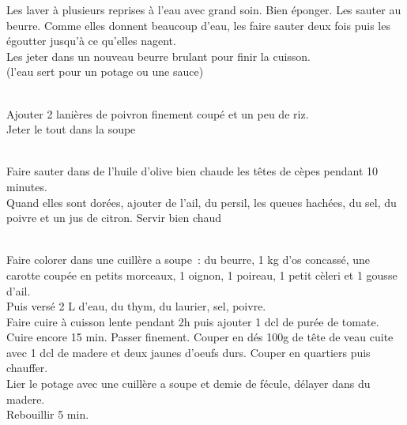 \begin{minipage}[c]{\textwidth}
Les laver à plusieurs reprises à l’eau avec grand soin. Bien éponger. Les sauter au beurre. Comme elles donnent beaucoup d'eau, les faire sauter deux fois puis les égoutter jusqu'à ce qu'elles nagent.\\
Les jeter dans un nouveau beurre brulant pour finir la cuisson.\\
(l'eau sert pour un potage ou une sauce)\\
\\

\end{minipage}

\begin{minipage}[c]{\textwidth}
Ajouter 2 lanières de poivron finement coupé et un peu de riz.\\
Jeter le tout dans la soupe\\
\\

\end{minipage}

\begin{minipage}[c]{\textwidth}
Faire sauter dans de l'huile d'olive bien chaude les têtes de cèpes pendant 10 minutes.\\
Quand elles sont dorées, ajouter de l'ail, du persil, les queues hachées, du sel, du poivre et un jus de citron. Servir bien chaud\\
\\

\end{minipage}

\begin{minipage}[c]{\textwidth}
Faire colorer dans une cuillère a soupe : du beurre, 1 kg d'os concassé, une carotte coupée en petits morceaux, 1 oignon, 1 poireau, 1 petit cèleri et 1 gousse d'ail.\\
Puis versé 2 L d'eau, du thym, du laurier, sel, poivre.\\
Faire cuire à cuisson lente pendant 2h puis ajouter 1 dcl de purée de tomate. Cuire encore 15 min. Passer finement. Couper en dés 100g de tête de veau cuite avec 1 dcl de madere et deux jaunes d'oeufs durs. Couper en quartiers puis chauffer.\\
Lier le potage avec une cuillère a soupe et demie de fécule, délayer dans du madere.\\
Rebouillir 5 min.\\
\\

\end{minipage}

